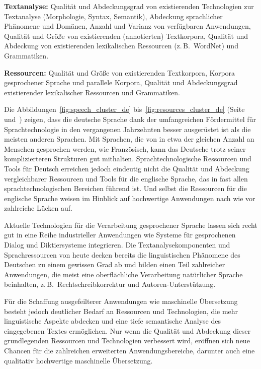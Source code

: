 \begin{multicols}{2}
\textbf{Textanalyse:} Qualität und Abdeckungsgrad von existierenden Technologien zur Textanalyse (Morphologie, Syntax, Semantik), Abdeckung sprachlicher Phänomene und Domänen, Anzahl und Varianz von verfügbaren Anwendungen, Qualität und Größe von existierenden (annotierten) Textkorpora, Qualität und Abdeckung von existierenden lexikalischen Ressourcen (z.\,B.~WordNet) und Grammatiken.

\textbf{Ressourcen:} Qualität und Größe von existierenden Textkorpora, Korpora gesprochener Sprache und parallele Korpora, Qualität und Abdeckungsgrad existierender lexikalischer Ressourcen und Grammatiken.

Die Abbildungen~\ref{fig:speech_cluster_de} bis~\ref{fig:resources_cluster_de} (Seite~\pageref{fig:speech_cluster_de} und~\pageref{fig:resources_cluster_de}) zeigen, dass die deutsche Sprache dank der umfangreichen Fördermittel für Sprachtechnologie in den vergangenen Jahrzehnten besser ausgerüstet ist als die meisten anderen Sprachen. Mit Sprachen, die von in etwa der gleichen Anzahl an Menschen gesprochen werden, wie Französisch, kann das Deutsche trotz seiner komplizierteren Strukturen gut mithalten. Sprachtechnologische Ressourcen und Tools für Deutsch erreichen jedoch eindeutig nicht die Qualität und Abdeckung vergleichbarer Ressourcen und Tools für die englische Sprache, das in fast allen sprachtechnologischen Bereichen führend ist. Und selbst die Ressourcen für die englische Sprache weisen im Hinblick auf hochwertige Anwendungen nach wie vor zahlreiche Lücken auf.

Aktuelle Technologien für die Verarbeitung gesprochener Sprache lassen sich recht gut in eine Reihe industrieller Anwendungen wie Systeme für gesprochenen Dialog und Diktiersysteme integrieren. Die Textanalysekomponenten und Sprachressourcen von heute decken bereits die linguistischen Phänomene des Deutschen zu einem gewissen Grad ab und bilden einen Teil zahlreicher Anwendungen, die meist eine oberflächliche Verarbeitung natürlicher Sprache beinhalten, z.\,B.~Rechtschreibkorrektur und Autoren-Unterstützung.

Für die Schaffung ausgefeilterer Anwendungen wie maschinelle Übersetzung besteht jedoch deutlicher Bedarf an Ressourcen und Technologien, die mehr linguistische Aspekte abdecken und eine tiefe semantische Analyse des eingegebenen Textes ermöglichen. Nur wenn die Qualität und Abdeckung dieser grundlegenden Ressourcen und Technologien verbessert wird, eröffnen sich neue Chancen für die zahlreichen erweiterten Anwendungsbereiche, darunter auch eine qualitativ hochwertige maschinelle Übersetzung.


\end{multicols}
